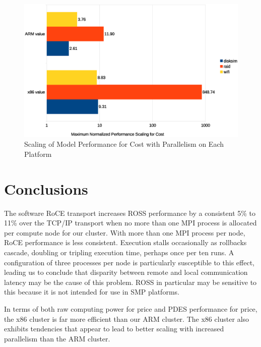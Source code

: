\documentclass[11pt]{book}
\begin{document}
\begin{figure}
\centering
\includegraphics[width=\textwidth]{costperf_summary}
\caption{Scaling of Model Performance for Cost with Parallelism on Each Platform}
\label{costperf-summary}
\end{figure}


\chapter{Conclusions}\label{conclusions}

The software RoCE transport increases ROSS performance by a consistent 5\% to 11\% over
the TCP/IP transport when no more than one MPI process is allocated per compute node for
our cluster.  With more than one MPI process per node, RoCE performance is less
consistent.  Execution stalls occasionally as rollbacks cascade, doubling or tripling
execution time, perhaps once per ten runs.  A configuration of three processes per node is
particularly susceptible to this effect, leading us to conclude that disparity between
remote and local communication latency may be the cause of this problem.  ROSS in
particular may be sensitive to this because it is not intended for use in SMP platforms.

In terms of both raw computing power for price and PDES performance for price, the x86
cluster is far more efficient than our ARM cluster.  The x86 cluster also
exhibits tendencies that appear to lead to better scaling with increased parallelism than
the ARM cluster.
\end{document}
